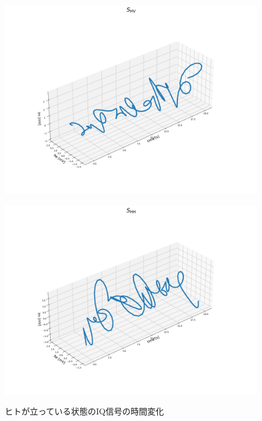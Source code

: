 \documentclass[uplatex,a4paper,12pt]{jsarticle}
\begin{document}
\begin{figure}[hbtp]
    \begin{minipage}[b]{0.48\columnwidth}
        \centering
        \includegraphics[scale=0.2]{../img/20230203_standing_4_Shv_x.png}
        \label{fig:hv}
    \end{minipage}
    \begin{minipage}[b]{0.48\columnwidth}
        \centering
        \includegraphics[scale=0.2]{../img/20230203_standing_4_Shh_x.png}
        \label{fig:hh}
    \end{minipage}\caption{ヒトが立っている状態のIQ信号の時間変化}
\end{figure}
\end{document}
